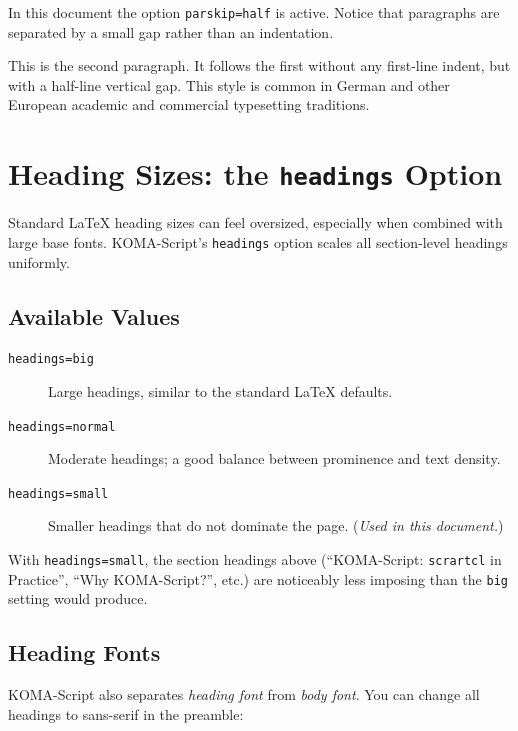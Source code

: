 \documentclass[
    12pt,               %
    a4paper,            %
    parskip=half,       %
    headings=small,     %
    DIV=12              %
]{scrartcl}
\begin{document}
In this document the option \texttt{parskip=half} is active. Notice that
paragraphs are separated by a small gap rather than an indentation.

This is the second paragraph. It follows the first without any first-line
indent, but with a half-line vertical gap. This style is common in German
and other European academic and commercial typesetting traditions.


\section{Heading Sizes: the \texttt{headings} Option}
\label{sec:headings}

Standard \LaTeX{} heading sizes can feel oversized, especially when combined
with large base fonts. KOMA-Script's \texttt{headings} option scales all
section-level headings uniformly.

\subsection{Available Values}

\begin{description}
    \item[\texttt{headings=big}]
        Large headings, similar to the standard \LaTeX{} defaults.
    \item[\texttt{headings=normal}]
        Moderate headings; a good balance between prominence and text density.
    \item[\texttt{headings=small}]
        Smaller headings that do not dominate the page. (\emph{Used in this
        document.})
\end{description}

With \texttt{headings=small}, the section headings above (``KOMA-Script:
\texttt{scrartcl} in Practice'', ``Why KOMA-Script?'', etc.) are noticeably
less imposing than the \texttt{big} setting would produce.

\subsection{Heading Fonts}

KOMA-Script also separates \emph{heading font} from \emph{body font}.
You can change all headings to sans-serif in the preamble:
\end{document}
